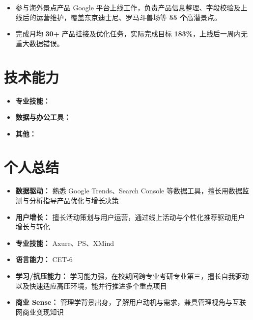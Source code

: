 \documentclass{resume}
\begin{document}
\begin{itemize}

\item 参与海外景点产品 Google 平台上线工作，负责产品信息整理、字段校验及上线后的运营维护，覆盖东京迪士尼、罗马斗兽场等 \textbf{55 个}高潜景点。

\item 完成月均 \textbf{30+} 产品挂接及优化任务，实际完成目标 \textbf{183\%}，上线后一周内无重大数据错误。

\end{itemize}

\section[技术能力]{技术能力}

\begin{itemize}
  \item \textbf{专业技能：}
  \item \textbf{数据与办公工具：}
  \item \textbf{其他：}
\end{itemize}

\section[个人总结]{个人总结}

\begin{itemize}
  \item \textbf{数据驱动：} 熟悉 Google Trends、Search Console 等数据工具，擅长用数据监测与分析指导产品优化与增长决策
  \item \textbf{用户增长：} 擅长活动策划与用户运营，通过线上活动与个性化推荐驱动用户增长与转化
  \item \textbf{专业技能：} Axure、PS、XMind
  \item \textbf{语言能力：} CET-6
  \item \textbf{学习/抗压能力：} 学习能力强，在校期间跨专业考研专业第三，擅长自我驱动以及快速适应高压环境，能并行推进多个重点项目
  \item \textbf{商业 Sense：} 管理学背景出身，了解用户动机与需求，兼具管理视角与互联网商业变现知识
\end{itemize}
\end{document}
